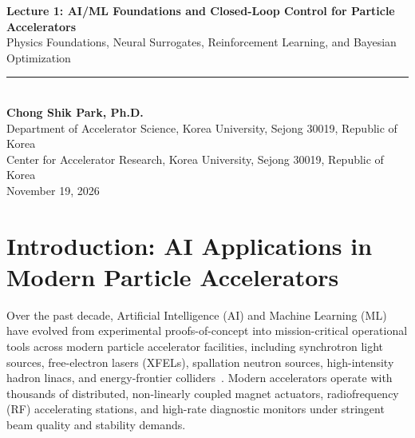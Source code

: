 \documentclass[11pt,a4paper]{article}
\newcommand{\affiliation}[1]{{\normalsize\color{darkgray} #1} \\[0.2em]}
\begin{document}
\begin{center}
    {\LARGE\bfseries\color{primaryblue} Lecture 1: AI/ML Foundations and Closed-Loop Control for Particle Accelerators} \\[0.8em]
    {\large\color{darkgray} Physics Foundations, Neural Surrogates, Reinforcement Learning, and Bayesian Optimization} \\[0.5em]
    \rule{\textwidth}{1.2pt} \\[0.5em]
    \textbf{Chong Shik Park, Ph.D.} \\[0.3em]
    \affiliation{Department of Accelerator Science, Korea University, Sejong 30019, Republic of Korea}
    \affiliation{Center for Accelerator Research, Korea University, Sejong 30019, Republic of Korea}
    \vspace{0.2em}
    {\small\color{darkgray} November 19, 2026}
\end{center}

\vspace{0.5em}

\begin{abstract}
Modern particle accelerator facilities operate with thousands of tightly coupled magnet actuators and diagnostics under sub-micron beam stability tolerances. Classical linear feedback systems face fundamental bottlenecks in non-linear regimes where magnetic core saturation and power supply limits degrade control fidelity. This lecture provides the theoretical and computational foundation bridging transverse beam dynamics, Hill's equation, and the Orbit Response Matrix (ORM) with cutting-edge supervised machine learning and reinforcement learning. We explore the design and training of neural surrogate digital twins to model cubic saturation, compare classical singular value decomposition (SVD) with model-based bounded optimization (\texttt{L-BFGS-B}), and investigate physics-informed closed-loop policy agents with adaptive damping for the afternoon Beam Orbit Alignment Mini-Hackathon.
\end{abstract}

\clearpage

\tableofcontents

\clearpage

\section{Introduction: AI Applications in Modern Particle Accelerators}

Over the past decade, Artificial Intelligence (AI) and Machine Learning (ML) have evolved from experimental proofs-of-concept into mission-critical operational tools across modern particle accelerator facilities, including synchrotron light sources, free-electron lasers (XFELs), spallation neutron sources, high-intensity hadron linacs, and energy-frontier colliders~\cite{edelen2020opportunities}. Modern accelerators operate with thousands of distributed, non-linearly coupled magnet actuators, radiofrequency (RF) accelerating stations, and high-rate diagnostic monitors under stringent beam quality and stability demands.
\end{document}
